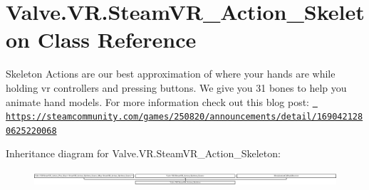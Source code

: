 \hypertarget{class_valve_1_1_v_r_1_1_steam_v_r___action___skeleton}{}\section{Valve.\+V\+R.\+Steam\+V\+R\+\_\+\+Action\+\_\+\+Skeleton Class Reference}
\label{class_valve_1_1_v_r_1_1_steam_v_r___action___skeleton}


Skeleton Actions are our best approximation of where your hands are while holding vr controllers and pressing buttons. We give you 31 bones to help you animate hand models. For more information check out this blog post\+: \href{https://steamcommunity.com/games/250820/announcements/detail/1690421280625220068}{\texttt{ https\+://steamcommunity.\+com/games/250820/announcements/detail/1690421280625220068}}  


Inheritance diagram for Valve.\+V\+R.\+Steam\+V\+R\+\_\+\+Action\+\_\+\+Skeleton\+:\begin{figure}[H]
\begin{center}
\leavevmode
\includegraphics[height=0.532573cm]{class_valve_1_1_v_r_1_1_steam_v_r___action___skeleton}
\end{center}
\end{figure}

